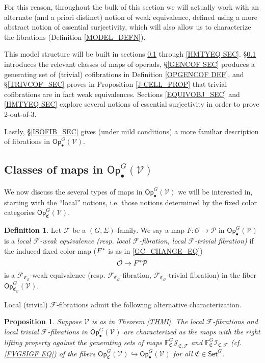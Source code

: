 \documentclass[a4paper,10pt
,draft
]{article}%
\numberwithin{equation}{section}
\numberwithin{figure}{section}
\newtheorem{proposition}[equation]{Proposition}%
\theoremstyle{definition} %
\newtheorem{definition}[equation]{Definition}%
\newcommand{\F}{\ensuremath{\mathcal F}}
\newcommand{\V}{\ensuremath{\mathcal V}}
\renewcommand{\O}{\ensuremath{\mathcal O}}
\renewcommand{\P}{\ensuremath{\mathcal P}}
\newcommand{\1}{\ensuremath{\mathbbm 1}}%
\begin{document}
For this reason, 
throughout the bulk of this section we will actually work with 
an alternate (and a priori distinct)
notion of weak equivalence,
defined using a more abstract notion of essential surjectivity,
which will also allow us to characterize the fibrations (Definition \ref{MODEL_DEFN}).


This model structure will be built in sections \ref{MAPSOPG_SEC} through \ref{HMTYEQ SEC}.
\S \ref{MAPSOPG_SEC} introduces the relevant classes of maps of operads,
\S \ref{GENCOF SEC} produces a generating set of (trivial) cofibrations in Definition \ref{OPGENCOF DEF},
and \S \ref{TRIVCOF_SEC} proves in Proposition \ref{J-CELL_PROP} that trivial cofibrations are in fact weak equivalences.
Sections \ref{EQUIVOBJ_SEC} and \ref{HMTYEQ SEC} explore several notions of essential surjectivity in order to prove 2-out-of-3.

Lastly, \S \ref{ISOFIB_SEC}
gives (under mild conditions) a more familiar description of fibrations in $\mathsf{Op}^G_\bullet(\V)$.





\subsection{Classes of maps in $\mathsf{Op}^G_\bullet(\V)$}
\label{MAPSOPG_SEC}


We now discuss the several types of maps in 
$\mathsf{Op}^G_\bullet(\V)$ we will be interested in,
starting with the ``local'' notions, 
i.e. those notions determined by the fixed color categories $\mathsf{Op}_{\mathfrak{C}}^G(\V)$.



\begin{definition}
Let $\F$ be a $(G, \Sigma)$-family.
%
We say a map $F: \O \to \P$ in $\mathsf{Op}^G_\bullet(\V)$
is a \emph{local $\F$-weak equivalence (resp. local $\F$-fibration, local $\F$-trivial fibration)}
if the induced fixed color map
($F^{\**}$ is as in \eqref{GC_CHANGE_EQ})
\[\O \to F^{\**} \P\]
is a $\F_{\mathfrak{C}_{\O}}$-weak equivalence (resp. $\F_{\mathfrak{C}_{\O}}$-fibration, $\F_{\mathfrak{C}_{\O}}$-trivial fibration) in the fiber $\mathsf{Op}^G_{\mathfrak{C}_{\O}}(\V)$.
\end{definition}


Local (trivial) $\F$-fibrations admit the following alternative characterization.



\begin{proposition}\label{LOCALTCHAR PROP}
Suppose $\V$ is as in Theorem \ref{THMI}.
The local $\F$-fibrations
and local trivial $\F$-fibrations
in $\mathsf{Op}^G_\bullet(\V)$
are characterized as the maps with the right lifting property against the generating sets of maps 
$\mathbb{F}^G_{\mathfrak{C}}\mathcal{J}_{\mathfrak{C},\mathcal{F}}$ and  $\mathbb{F}^G_{\mathfrak{C}}\mathcal{I}_{\mathfrak{C},\mathcal{F}}$
(cf. \eqref{FVGSIGF EQ})
of the fibers 
$\mathsf{Op}^G_{\mathfrak{C}}(\V) \hookrightarrow \mathsf{Op}^G_\bullet(\V)$
for all $\mathfrak{C} \in \mathsf{Set}^G$.
\end{proposition}
\end{document}
